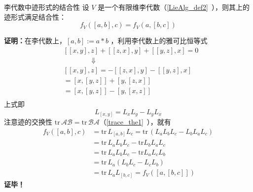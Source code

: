 \begin{theorem}{李代数中迹形式的结合性}
设 $V$ 是一个有限维李代数（\autoref{LieAlg_def2}~），则其上的迹形式满足结合性：
\begin{equation}
f_V([a,b],c)=f_V(a,[b,c])
\end{equation}
\end{theorem}
\textbf{证明：}在李代数上，$[a,b]:=a*b$ ，利用李代数上的雅可比恒等式
\begin{equation}
\begin{aligned}
&[[x,y],z]+[[z,x],y]+[[y,z],x]=0\\
&\qquad\qquad\Downarrow\\
&[[x,y],z]=-[[z,x],y]-[[y,z],x]\\
&=[x,[y,z]]+[y,[z,x]]\\
&=[x,[y,z]]-[y,[x,z]]\\
\end{aligned}
\end{equation}
上式即
\begin{equation}
L_{[x,y]}=L_xL_y-L_yL_x
\end{equation}
注意迹的交换性 $\mathrm{tr}\, \mathcal A\mathcal B=\mathrm{tr}\, \mathcal B\mathcal A$（\autoref{trace_the1}~），就有
\begin{equation}
\begin{aligned}
f_V([a,b],c)&=\mathrm{tr}\,L_{[a,b]}L_c=\mathrm{tr}\,(L_aL_bL_c-L_bL_aL_c)\\
&=\mathrm{tr}\,L_aL_bL_c-\mathrm{tr}L_bL_aL_c\\
&=\mathrm{tr}\,L_aL_bL_c-\mathrm{tr}L_aL_cL_b\\
&=\mathrm{tr}\,L_a(L_bL_c-L_cL_b)\\
&=\mathrm{tr}\,L_aL_{[b,c]}=f_V([a,[b,c]])
\end{aligned}
\end{equation}
\textbf{证毕！}

